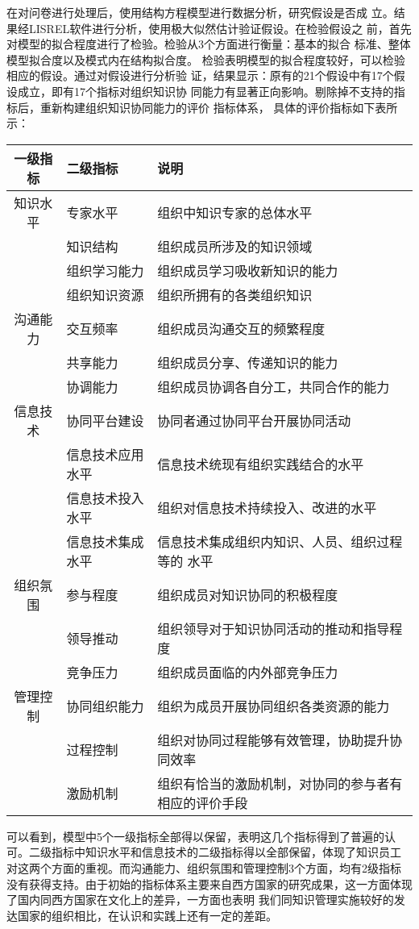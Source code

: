 \documentclass[adobefonts,UTF8]{ctexart}
\begin{document}
在对问卷进行处理后，使用结构方程模型进行数据分析，研究假设是否成
立。结果经LISREL软件进行分析，使用极大似然估计验证假设。在检验假设之
前，首先对模型的拟合程度进行了检验。检验从3个方面进行衡量：基本的拟合
标准、整体模型拟合度以及模式内在结构拟合度\cite{bagozzi1988evaluation}。
检验表明模型的拟合程度较好，可以检验相应的假设。通过对假设进行分析验
证，结果显示：原有的21个假设中有17个假设成立，即有17个指标对组织知识协
同能力有显著正向影响。剔除掉不支持的指标后，重新构建组织知识协同能力的评价
指标体系，
具体的评价指标如下表所示：
\begin{center}
  

  \begin{supertabular}[center]{cll}
\hline
    一级指标&二级指标&说明\\\hline
    知识水平&专家水平&组织中知识专家的总体水平\\
          &知识结构&组织成员所涉及的知识领域    \\
          &组织学习能力&组织成员学习吸收新知识的能力\\
          &组织知识资源&组织所拥有的各类组织知识 \\
    沟通能力&交互频率&组织成员沟通交互的频繁程度\\
          &共享能力&组织成员分享、传递知识的能力\\
          &协调能力&组织成员协调各自分工，共同合作的能力\\
    信息技术&协同平台建设&协同者通过协同平台开展协同活动\\
          &信息技术应用水平&信息技术统现有组织实践结合的水平\\
          &信息技术投入水平&组织对信息技术持续投入、改进的水平\\
          &信息技术集成水平&信息技术集成组织内知识、人员、组织过程等的
          水平\\
    组织氛围&参与程度&组织成员对知识协同的积极程度\\
          &领导推动&组织领导对于知识协同活动的推动和指导程度\\
          &竞争压力&组织成员面临的内外部竞争压力\\
    管理控制&协同组织能力&组织为成员开展协同组织各类资源的能力\\
          &过程控制&组织对协同过程能够有效管理，协助提升协同效率\\
          &激励机制&组织有恰当的激励机制，对协同的参与者有相应的评价手段\\\hline
  \end{supertabular}
\end{center}
可以看到，模型中5个一级指标全部得以保留，表明这几个指标得到了普遍的认
可。二级指标中知识水平和信息技术的二级指标得以全部保留，体现了知识员工
对这两个方面的重视。而沟通能力、组织氛围和管理控制3个方面，均有2级指标
没有获得支持。由于初始的指标体系主要来自西方国家的研究成果，这一方面体现了国内同西方国家在文化上的差异，一方面也表明
我们同知识管理实施较好的发达国家的组织相比，在认识和实践上还有一定的差距。
\end{document}
